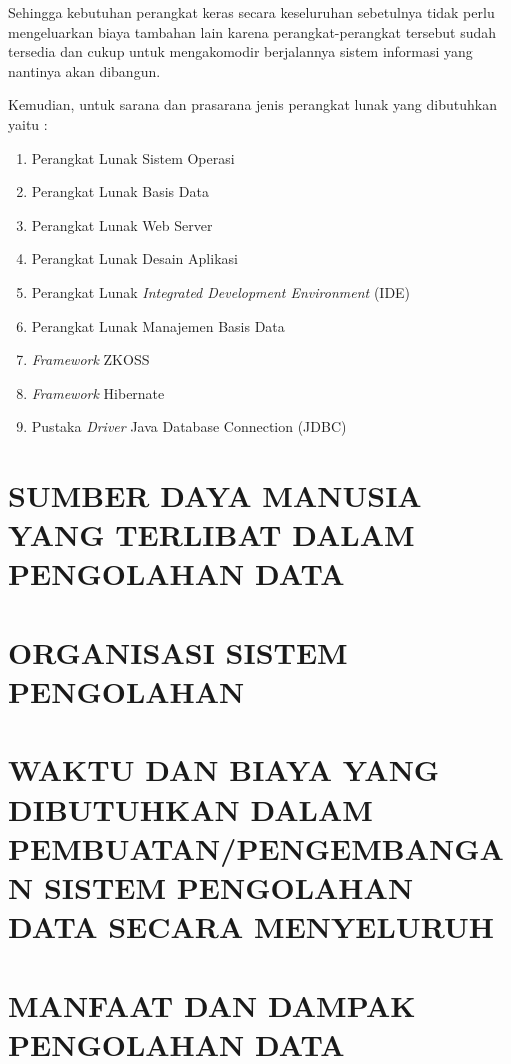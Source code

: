 \documentclass[pdftex,12pt, oneside]{article}
\begin{document}
Sehingga kebutuhan perangkat keras secara keseluruhan sebetulnya tidak perlu mengeluarkan biaya tambahan lain karena perangkat-perangkat tersebut sudah tersedia dan cukup untuk mengakomodir berjalannya sistem informasi yang nantinya akan dibangun.

Kemudian, untuk sarana dan prasarana jenis perangkat lunak yang dibutuhkan yaitu :

\begin{enumerate}[1.]
  \item Perangkat Lunak Sistem Operasi
  


  \item Perangkat Lunak Basis Data
  
  \item Perangkat Lunak Web Server
  
  \item Perangkat Lunak Desain Aplikasi
  
  \item Perangkat Lunak \textit{Integrated Development Environment} (IDE)
  
  \item Perangkat Lunak Manajemen Basis Data
  
  \item \textit{Framework} ZKOSS
  
  \item \textit{Framework} Hibernate
  
  \item Pustaka \textit{Driver} Java Database Connection (JDBC)
\end{enumerate}

\section{SUMBER DAYA MANUSIA YANG TERLIBAT DALAM PENGOLAHAN DATA}


\section{ORGANISASI SISTEM PENGOLAHAN}


\section{WAKTU DAN BIAYA YANG DIBUTUHKAN DALAM PEMBUATAN/PENGEMBANGAN SISTEM PENGOLAHAN DATA SECARA MENYELURUH}


\section{MANFAAT DAN DAMPAK PENGOLAHAN DATA}
\end{document}
